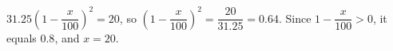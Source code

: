 $31.25\left(1-\dfrac x{100}\right)^2=20$, so $\left(1-\dfrac x{100}\right)^2=\dfrac{20}{31.25}=0.64$. Since $1-\dfrac{x}{100}>0$, it equals $0.8$, and $x=\boxed{20}$.
